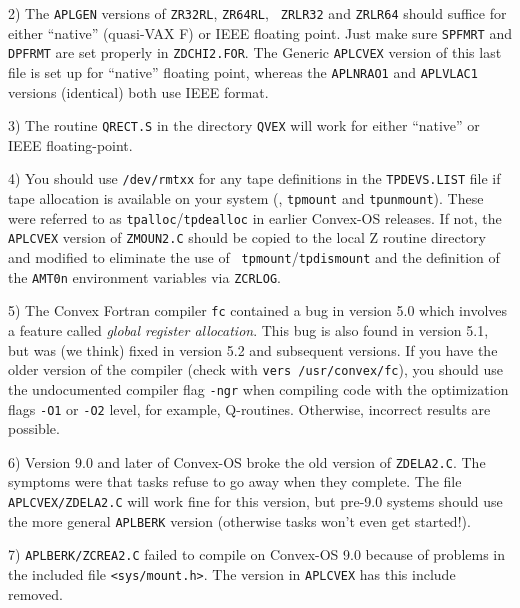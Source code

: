 {\item{2)} The {\tt\dol APLGEN} versions of {\tt ZR32RL}, {\tt ZR64RL}, {\tt
ZRLR32} and {\tt ZRLR64} should suffice for either ``native''
(quasi-VAX F) or IEEE floating point.  Just make sure {\tt SPFMRT} and
{\tt DPFRMT} are set properly in {\tt ZDCHI2.FOR}.  The Generic
{\tt\dol APLCVEX} version of this last file is set up for ``native''
floating point, whereas the {\tt\dol APLNRAO1} and {\tt\dol APLVLAC1}
versions (identical) both use IEEE format.

\item{3)} The routine {\tt QRECT.S} in the directory {\tt \dol QVEX} will
work for either ``native'' or IEEE floating-point.

\item{4)} You should use {\tt /dev/rmtxx} for any tape definitions in
the {\tt TPDEVS.LIST} file if tape allocation is available on your
system (\ie, {\tt tpmount} and {\tt tpunmount}).  These were referred to
as {\tt tpalloc}/{\tt tpdealloc} in earlier Convex-OS releases.  If not,
the {\tt \dol APLCVEX} version of {\tt ZMOUN2.C} should be copied to the
local Z routine directory and modified to eliminate the use of {\tt
tpmount}/{\tt tpdismount} and the definition of the {\tt AMT0n}
environment variables via {\tt ZCRLOG}.\medskip

\item{5)} The Convex Fortran compiler {\tt fc} contained a bug in version
5.0 which involves a feature called {\it global register allocation\/}.
This bug is also found in version 5.1, but was (we think) fixed in
        version 5.2 and subsequent versions.  If you have the older version of
the compiler (check with {\tt vers /usr/convex/fc}), you should use the
undocumented compiler flag {\tt -ngr} when compiling code with the
optimization flags {\tt -O1} or {\tt -O2} level, for example,
Q-routines.  Otherwise, incorrect results are possible.\medskip

\item{6)} Version 9.0 and later of Convex-OS broke the old version of
{\tt ZDELA2.C}.  The symptoms were that tasks refuse to go away
when they complete.  The file {\tt\dol APLCVEX/ZDELA2.C} will work fine
for this version, but pre-9.0 systems should use the more general
{\tt\dol APLBERK} version (otherwise tasks won't even get started!).

\item{7)} {\tt\dol APLBERK/ZCREA2.C} failed to compile on Convex-OS 9.0
because of problems in the included file {\tt <sys/mount.h>}.  The
version in {\tt\dol APLCVEX} has this include removed.  \medskip

}
